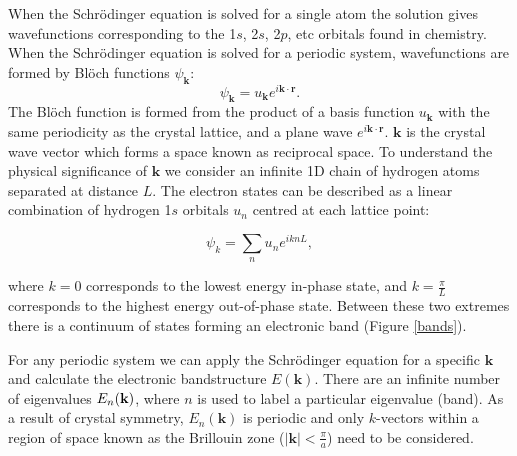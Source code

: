 When the Schr\"{o}dinger equation is solved for a single atom the solution gives wavefunctions corresponding to the 1$s$, 2$s$, 2$p$, etc orbitals found in chemistry. When the Schr\"{o}dinger equation is solved for a periodic system, wavefunctions are formed by Bl\"{o}ch functions $\psi_{\textbf{k}}$:\autocite{Hoffmann1987}
\begin{equation} \label{bloch}
\psi_{\textbf{k}} = u_\textbf{k}e^{i\textbf{k}\cdot\textbf{r}}.
\end{equation}   %
The Bl\"{o}ch function is formed from the product of a basis function $u_\textbf{k}$ with the same periodicity as the crystal lattice, and a plane wave $e^{i\textbf{k}\cdot\textbf{r}}$. $\textbf{k}$ is the crystal wave vector which forms a space known as reciprocal space. To understand the physical significance of $\textbf{k}$ we consider an infinite 1D chain of hydrogen atoms separated at distance $L$. The electron states can be described as a linear combination of hydrogen 1$s$ orbitals $u_n$ centred at each lattice point:

\begin{equation} \label{1dbloch}
\psi_k = \sum_nu_ne^{iknL},
\end{equation}

where $k=0$ corresponds to the lowest energy in-phase state, and $k=\frac{\pi}{L}$ corresponds to the highest energy out-of-phase state.
Between these two extremes there is a continuum of states forming an electronic band (Figure \ref{bands}). 

For any periodic system we can apply the Schr\"{o}dinger equation for a specific $\textbf{k}$ and calculate the electronic bandstructure $E(\textbf{k})$. There are an infinite number of eigenvalues $E_n(\textbf{\textbf{k}})$, where $n$ is used to label a particular eigenvalue (band). As a result of crystal symmetry, $E_n(\textbf{k})$ is periodic and only $k$-vectors within a region of space known as the Brillouin zone ($|\textbf{k}|<\frac{\pi}{a}$) need to be considered.\autocite{Lundstrom2000} 

